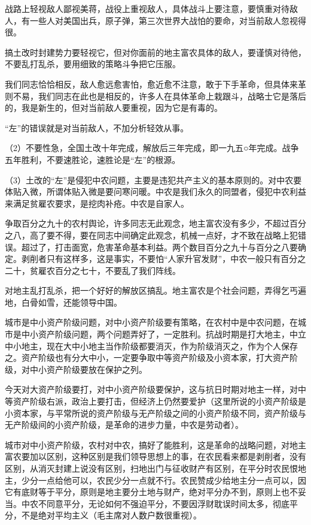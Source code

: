 战路上轻视敌人鄙视美蒋，战役上重视敌人，具体战斗上要注意，要慎重对待敌人，有一些人对美国出兵，原子弹，第三次世界大战怕的要命，对当前敌人忽视得很。

搞土改时封建势力要轻视它，但对你面前的地主富农具体的敌人，要谨慎对待他，不要乱打乱杀，要用细致的策略斗争把它压服。

我们同志恰恰相反，敌人愈远愈害怕，愈近愈不注意，敢于下手革命，但具体来革则不易，我们同志在此也是相反的，许多人在具体革命上栽跟斗，战略士它是落后的，我是新生的，但对当前敌人要重视，因为它是有毒的。

“左”的错误就是对当前敌人，不加分析轻效从事。

（2）不要性急，全国土改十年完成，解放后三年完成，即一九五○年完成。战争五年胜利，不要速胜论，速胜论是“左”的根源。

（3）土改的“左”是侵犯中农问题，主要是违犯共产主义的基本原则的。对中农要体贴入微，所谓体贴入微是要问寒问暖。中农是我们永久的同盟者，侵犯中农利益来满足贫雇农要求，是挖肉补疮。中农是自家人。

争取百分之九十的农村舆论，许多同志无此观念，地主富农没有多少，不超过百分之八，高了要不得，要在同志中间确定此观念，机械一点好，才不致在战略上犯错误。超过了，打击面宽，危害革命基本利益。两个数目百分之九十与百分之八要确定。剥削者只有这样多，这是事实，不要怕“人家升官发财”，中农一般只有百分之二十，贫雇农百分之七十，不要乱了我们阵线。

对地主乱打乱杀，把一个好好的解放区搞乱。地主富农是个社会问题，弄得乞丐遍地，白骨如雪，还能领导中国。

城市是中小资产阶级问题，对中小资产阶级要有策略，在农村中是中农问题，在城市是中小资产阶级问题，两个问题弄好了，一定胜利。抗战时期是打大地主，中立中小地主，现在大中小地主当作阶级都要消灭，作为阶级消灭之，作为个人保存之。资产阶级也有分大中小，一定要争取中等资产阶级及小资本家，打大资产阶级，对中小资产阶级要放在保护之列。

今天对大资产阶级要打，对中小资产阶级要保护，这与抗日时期对地主一样，对中等资产阶级右派，政治上要打击，但经济上仍然要爱护（这里所说的小资产阶级是小资本家，与平常所说的资产阶级与无产阶级之间的小资产阶级不同，资产阶级与无产阶级间的小资产阶级，是革命的进步力量，中农是劳动者）。

城市对中小资产阶级，农村对中农，搞好了能胜利，这是革命的战略问题，对地主富农要加以区别，这种区别是我们领导思想上的事，在农民看来都是剥削者，没有区别，从消灭封建上说没有区别，扫地出门与征收财产有区别，在平分时农民恨地主，少分一点给他可以，农民少分一点就不行。农民赞成少给地主分一点可以，因它有底财等于平分，原则是地主要分土地与财产，绝对平分办不到，原则上也不妥当。中农不同意平分，无论如何不强迫平分，不要因浮财耽误时间太多，彻底平分，不是绝对平均主义（毛主席对人数户数很重视）。

